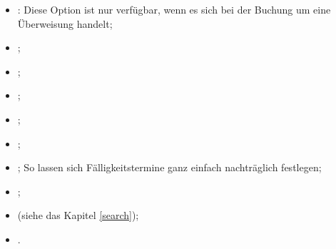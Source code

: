 \vspace{3mm}
\noindent
\begin{minipage}{.65\linewidth}
	\begin{itemize}[rightmargin=.6cm]
		\item {}: Diese Option ist nur verfügbar, wenn es sich bei der Buchung um eine Überweisung handelt;
		\item {};
		\item {};
		\item {};
		\item {};
		\item {};
		\item {}; So lassen sich Fälligkeitstermine ganz einfach nachträglich festlegen;
		\item {};
		\item {} (siehe das Kapitel \vref{search});
		\item {}.
	\end{itemize}
\end{minipage}
